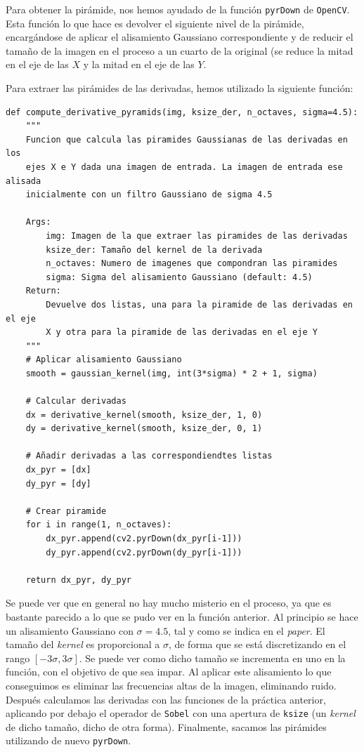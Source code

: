 \documentclass[11pt,a4paper]{article}
\begin{document}
Para obtener la pirámide, nos hemos ayudado de la función \texttt{pyrDown}
de \texttt{OpenCV}. Esta función lo que hace es devolver el siguiente
nivel de la pirámide, encargándose de aplicar el alisamiento Gaussiano
correspondiente y de reducir el tamaño de la imagen en el proceso a
un cuarto de la original (se reduce la mitad en el eje de las $X$ y la mitad
en el eje de las $Y$.

Para extraer las pirámides de las derivadas, hemos utilizado la siguiente función:

\begin{lstlisting}
def compute_derivative_pyramids(img, ksize_der, n_octaves, sigma=4.5):
    """
    Funcion que calcula las piramides Gaussianas de las derivadas en los
    ejes X e Y dada una imagen de entrada. La imagen de entrada ese alisada
    inicialmente con un filtro Gaussiano de sigma 4.5

    Args:
        img: Imagen de la que extraer las piramides de las derivadas
        ksize_der: Tamaño del kernel de la derivada
        n_octaves: Numero de imagenes que compondran las piramides
        sigma: Sigma del alisamiento Gaussiano (default: 4.5)
    Return:
        Devuelve dos listas, una para la piramide de las derivadas en el eje
        X y otra para la piramide de las derivadas en el eje Y
    """
    # Aplicar alisamiento Gaussiano
    smooth = gaussian_kernel(img, int(3*sigma) * 2 + 1, sigma)

    # Calcular derivadas
    dx = derivative_kernel(smooth, ksize_der, 1, 0)
    dy = derivative_kernel(smooth, ksize_der, 0, 1)

    # Añadir derivadas a las correspondiendtes listas
    dx_pyr = [dx]
    dy_pyr = [dy]

    # Crear piramide
    for i in range(1, n_octaves):
        dx_pyr.append(cv2.pyrDown(dx_pyr[i-1]))
        dy_pyr.append(cv2.pyrDown(dy_pyr[i-1]))
    
    return dx_pyr, dy_pyr
\end{lstlisting}

Se puede ver que en general no hay mucho misterio en el proceso, ya que es
bastante parecido a lo que se pudo ver en la función anterior. Al principio se hace
un alisamiento Gaussiano con $\sigma = 4.5$, tal y como se indica en el \textit{paper}.
El tamaño del \textit{kernel} es proporcional a $\sigma$, de forma que se está
discretizando en el rango $[-3\sigma, 3\sigma]$. Se puede ver como dicho tamaño se
incrementa en uno en la función, con el objetivo de que sea impar.
Al aplicar este alisamiento lo que conseguimos es eliminar las frecuencias altas
de la imagen, eliminando ruido.
Después calculamos las derivadas con las funciones de la práctica
anterior, aplicando por debajo el operador de \texttt{Sobel} con una apertura de
\texttt{ksize} (un \textit{kernel} de dicho tamaño, dicho de otra forma).
Finalmente, sacamos las pirámides utilizando de nuevo \texttt{pyrDown}.
\end{document}
